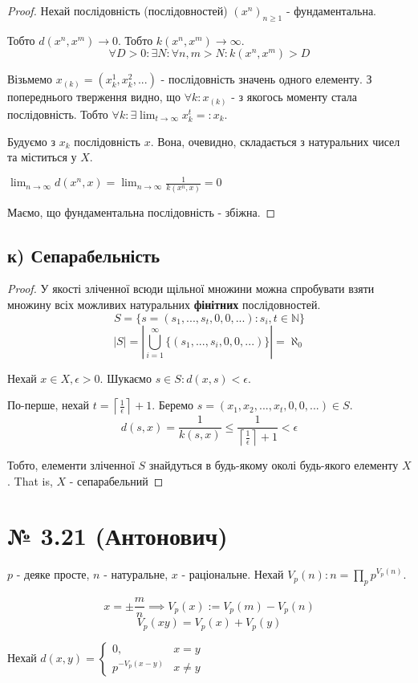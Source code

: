 \documentclass[11pt, a4paper]{article} %
\begin{document}
\begin{proof}
    Нехай послідовність (послідовностей) $(x^n)_{n\ge 1}$ - фундаментальна.

    Тобто $d(x^n, x^m) \to 0$. Тобто $k(x^n, x^m) \to \infty$.
    $$\forall D>0: \exists N: \forall n,m >N: k(x^n, x^m) > D$$

    Візьмемо $x_{(k)} = (x_k^1, x_k^2, ...)$ - послідовність значень одного елементу.
    З попереднього тверження видно, що $\forall k: x_{(k)}$ - з якогось моменту стала послідовність.
    Тобто $\forall k: \exists \lim_{t\to\infty} x_k^t =: x_k$.
    
    Будуємо з $x_k$ послідовність $x$. Вона, очевидно, складається з натуральних чисел та міститься у $X$.

    $\lim_{n\to\infty} d(x^n, x) = \lim_{n\to\infty} \frac{1}{k(x^n,x)} = 0$

    Маємо, що фундаментальна послідовність - збіжна.
\end{proof}

\subsection*{к) Сепарабельність}
\begin{proof}
    У якості зліченної всюди щільної множини можна спробувати взяти множину всіх можливих 
    натуральних \textbf{фінітних} послідовностей.
    $$S = \{s = (s_1, ..., s_t, 0, 0, ...) : s_i, t \in \mathbb N\}$$
    $$|S| = |\bigcup_{i=1}^\infty \{(s_1, ..., s_i, 0, 0, ...)\}| = \aleph_0$$

    Нехай $x \in X, \epsilon > 0$. Шукаємо $s\in S: d(x,s) < \epsilon$.
    
    По-перше, нехай $t = \left\lceil\frac{1}{\epsilon}\right\rceil + 1$.
    Беремо $s = (x_1, x_2, ... ,x_t, 0, 0, ...) \in S$.
    $$d(s, x) = \frac{1}{k(s,x)} \le \frac{1}{\left\lceil\frac{1}{\epsilon}\right\rceil + 1} < \epsilon$$

    Тобто, елементи зліченної $S$ знайдуться в будь-якому околі будь-якого елементу $X$. 
    That is, $X$ - сепарабельний
\end{proof}

\section*{№ 3.21 (Антонович)}
\begin{mdframed}
    $p$ - деяке просте, $n$ - натуральне, $x$ - раціональне.
    Нехай $V_p(n) : n = \prod_p p^{V_p(n)}$.

    $$x = \pm\frac{m}{n} \implies V_p(x) := V_p(m) - V_p(n)$$
    $$V_p(xy) = V_p(x) + V_p(y)$$

    Нехай $d(x,y) = \begin{cases}
        0, & x=y \\
        p^{-V_p(x-y)}& x\ne y
    \end{cases}$
\end{mdframed}
\end{document}
